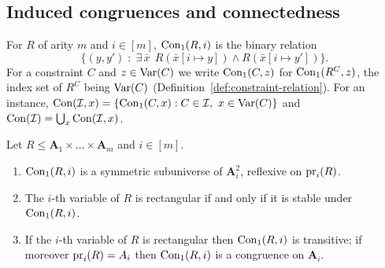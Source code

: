 \subsection{Induced congruences and connectedness}

\begin{definition}[$\ConOne$]\label{def:conone}
For $R$ of arity $m$ and $i\in[m]$, $\operatorname{Con}_1(R,i)$ is the binary relation
\[
  \{(y,y')\;:\;\exists\,\bar x\ \ R(\bar x[i\mapsto y])\wedge R(\bar x[i\mapsto y'])\}.
\]
For a constraint $C$ and $z\in\operatorname{Var}(C)$ we write $\operatorname{Con}_1(C,z)$ for
$\operatorname{Con}_1(R^{C},z)$, the index set of $R^{C}$ being $\operatorname{Var}(C)$
(Definition~\ref{def:constraint-relation}). For an instance,
$\operatorname{Con}(\mathcal I,x)=\{\operatorname{Con}_1(C,x):C\in\mathcal I,\ x\in\operatorname{Var}(C)\}$ and
$\operatorname{Con}(\mathcal I)=\bigcup_{x}\operatorname{Con}(\mathcal I,x)$.
\end{definition}

\begin{lemma}\label{lem:conone-basics}
Let $R\le\mathbf A_{1}\times\dots\times\mathbf A_{m}$ and $i\in[m]$.
\begin{enumerate}\alphlabels\tightlist
\item $\operatorname{Con}_1(R,i)$ is a symmetric subuniverse of $\mathbf A_{i}^{2}$,
  reflexive on $\operatorname*{pr}_{i}(R)$.
\item The $i$-th variable of $R$ is rectangular if and only if it is stable
  under $\operatorname{Con}_1(R,i)$.
\item If the $i$-th variable of $R$ is rectangular then $\operatorname{Con}_1(R,i)$ is
  transitive; if moreover $\operatorname*{pr}_{i}(R)=A_{i}$ then $\operatorname{Con}_1(R,i)$ is a
  congruence on $\mathbf A_{i}$.
\end{enumerate}
\end{lemma}

